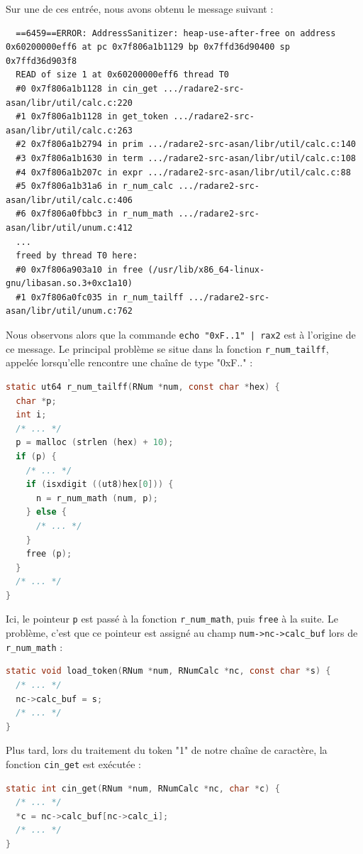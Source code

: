 Sur une de ces entrée, nous avons obtenu le message suivant :

\begin{lstlisting}
  ==6459==ERROR: AddressSanitizer: heap-use-after-free on address 0x60200000eff6 at pc 0x7f806a1b1129 bp 0x7ffd36d90400 sp 0x7ffd36d903f8
  READ of size 1 at 0x60200000eff6 thread T0
  #0 0x7f806a1b1128 in cin_get .../radare2-src-asan/libr/util/calc.c:220
  #1 0x7f806a1b1128 in get_token .../radare2-src-asan/libr/util/calc.c:263
  #2 0x7f806a1b2794 in prim .../radare2-src-asan/libr/util/calc.c:140
  #3 0x7f806a1b1630 in term .../radare2-src-asan/libr/util/calc.c:108
  #4 0x7f806a1b207c in expr .../radare2-src-asan/libr/util/calc.c:88
  #5 0x7f806a1b31a6 in r_num_calc .../radare2-src-asan/libr/util/calc.c:406
  #6 0x7f806a0fbbc3 in r_num_math .../radare2-src-asan/libr/util/unum.c:412
  ...
  freed by thread T0 here:
  #0 0x7f806a903a10 in free (/usr/lib/x86_64-linux-gnu/libasan.so.3+0xc1a10)
  #1 0x7f806a0fc035 in r_num_tailff .../radare2-src-asan/libr/util/unum.c:762
\end{lstlisting}

Nous observons alors que la commande \lstinline{echo "0xF..1" | rax2} est à l'origine de ce message.
Le principal problème se situe dans la fonction \lstinline{r_num_tailff}, appelée lorsqu'elle rencontre une chaîne de type "0xF.." :

\begin{lstlisting}[language=C]
static ut64 r_num_tailff(RNum *num, const char *hex) {
  char *p;
  int i;
  /* ... */
  p = malloc (strlen (hex) + 10);
  if (p) {
    /* ... */
    if (isxdigit ((ut8)hex[0])) {
      n = r_num_math (num, p);
    } else {
      /* ... */
    }
    free (p);
  }
  /* ... */
}
\end{lstlisting}

Ici, le pointeur \lstinline{p} est passé à la fonction \lstinline{r_num_math}, puis \lstinline{free} à la suite.
Le problème, c'est que ce pointeur est assigné au champ \lstinline{num->nc->calc_buf} lors de \lstinline{r_num_math} :

\begin{lstlisting}[language=C]
static void load_token(RNum *num, RNumCalc *nc, const char *s) {
  /* ... */
  nc->calc_buf = s;
  /* ... */
}
\end{lstlisting}

Plus tard, lors du traitement du token "1" de notre chaîne de caractère, la fonction \lstinline{cin_get} est exécutée :

\begin{lstlisting}[language=C]
static int cin_get(RNum *num, RNumCalc *nc, char *c) {
  /* ... */
  *c = nc->calc_buf[nc->calc_i];
  /* ... */
}
\end{lstlisting}

